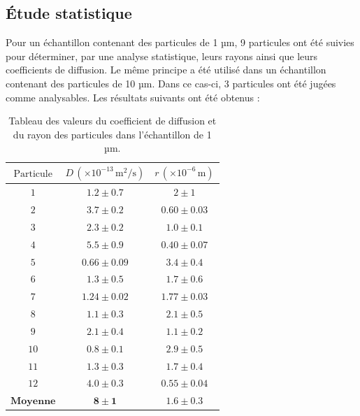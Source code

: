 \documentclass[11pt,letterpaper]{article}
\begin{document}
\subsection{Étude statistique}
Pour un échantillon contenant des particules de 1 µm, 9 particules ont été suivies pour déterminer, par une analyse statistique, leurs rayons ainsi que leurs coefficients de diffusion. 
Le même principe a été utilisé dans un échantillon contenant des particules de 10 µm. Dans ce cas-ci, 3 particules ont été jugées comme analysables. 
Les résultats suivants ont été obtenus :

\begin{table}[H]
  \centering
  \caption{Tableau des valeurs du coefficient de diffusion et du rayon des particules dans l'échantillon de 1 µm.}
  \begin{tabular}{|c|c|c|}
  \hline
  \( \text{Particule} \) &\( D \, (\times 10^{-13} \, \text{m}^2/\text{s}) \) & \( r \, (\times 10^{-6} \, \text{m}) \) \\
  \hline
  \( 1 \) &\( 1.2 \pm 0.7 \) & \( 2 \pm 1 \) \\
  \( 2 \) &\( 3.7 \pm 0.2 \) & \( 0.60 \pm 0.03 \) \\
  \( 3 \) &\( 2.3 \pm 0.2 \) & \( 1.0 \pm 0.1 \) \\
  \( 4 \) &\( 5.5 \pm 0.9 \) & \( 0.40 \pm 0.07 \) \\
  \( 5 \) &\( 0.66 \pm 0.09 \) & \( 3.4 \pm 0.4 \) \\
  \( 6 \) &\( 1.3 \pm 0.5 \) & \( 1.7 \pm 0.6 \) \\
  \( 7 \) &\( 1.24 \pm 0.02 \) & \( 1.77 \pm 0.03 \) \\
  \( 8 \) &\( 1.1 \pm 0.3 \) & \( 2.1 \pm 0.5 \) \\
  \( 9 \) &\( 2.1 \pm 0.4 \) & \( 1.1 \pm 0.2 \) \\
  \( 10 \) &\( 0.8 \pm 0.1 \) & \( 2.9 \pm 0.5 \) \\
  \( 11 \) &\( 1.3 \pm 0.3 \) & \( 1.7 \pm 0.4 \) \\
  \( 12 \) &\( 4.0 \pm 0.3 \) & \( 0.55 \pm 0.04 \) \\
  \hline
  \hline
  \( \textbf{Moyenne} \) & \( \mathbf{8 \pm 1} \) & \( \mathbf{1.6 \pm 0.3} \) \\
  \hline
  \end{tabular}
\end{table}
\end{document}
